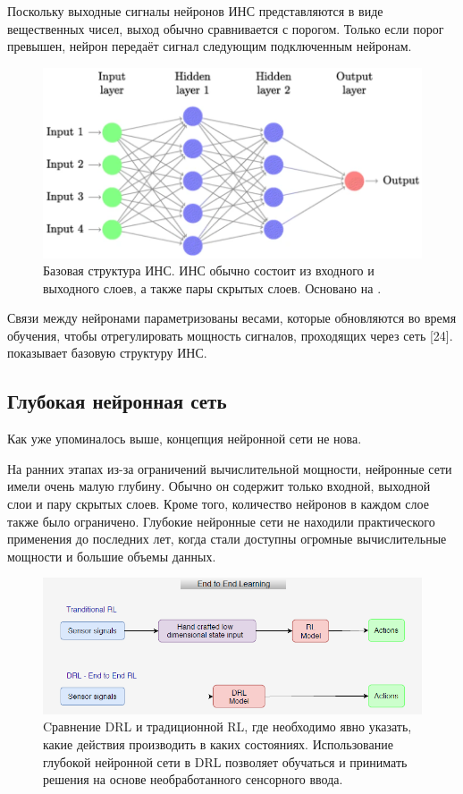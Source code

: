 Поскольку выходные сигналы нейронов ИНС представляются в виде вещественных чисел, выход обычно сравнивается с порогом. Только если порог превышен, нейрон передаёт сигнал следующим подключенным нейронам. 

\begin{figure}[ht!] 
	\center
	\includegraphics [scale=0.60] {my_folder/images/ch1/ANN.png}
	\caption{Базовая структура ИНС. ИНС обычно состоит из входного и выходного слоев, а также пары скрытых слоев. Основано на \cite{Khajanchi2003ArtificialNN} \cite{mitchell1997machine}.} 
	\label{fig:ch1-ANN}
\end{figure}

Связи между нейронами параметризованы весами, которые обновляются во время обучения, чтобы отрегулировать мощность сигналов, проходящих через сеть [24].  показывает базовую структуру ИНС.


\subsection{Глубокая нейронная сеть}

Как уже упоминалось выше, концепция нейронной сети не нова.

На ранних этапах из-за ограничений вычислительной мощности, нейронные сети имели очень малую глубину. Обычно он содержит только входной, выходной слои и пару скрытых слоев. Кроме того, количество нейронов в каждом слое также было ограничено. Глубокие нейронные сети не находили практического применения до последних лет, когда стали доступны огромные вычислительные мощности и большие объемы данных.

\begin{figure}[ht!] 
	\center
	\includegraphics [scale=0.80] {my_folder/images/ch1/DRL-flow.png}
	\caption{Cравнение DRL и традиционной RL, где необходимо явно указать, какие действия производить в каких состояниях. Использование глубокой нейронной сети в DRL позволяет обучаться и принимать решения на основе необработанного сенсорного ввода.} 
	\label{fig:DRL-flow}
\end{figure}

